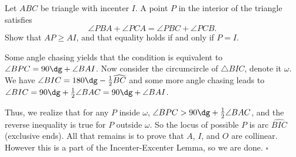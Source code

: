 
\begin{problem}[ISL 2006 G1]
    Let $ABC$ be triangle with incenter $I$. A point $P$ in the interior of the
    triangle satisfies \[\angle PBA+\angle PCA = \angle PBC+\angle PCB.\]
    Show that $AP \geq AI$, and that equality holds if and only if $P=I$.
\end{problem}

\begin{solution}[Ritwin]
    Some angle chasing yields that the condition is equivalent to
    $\angle BPC = 90\dg + \angle BAI$. Now consider the circumcircle of
    $\triangle BIC$, denote it $\omega$. We have $\angle BIC = 180\dg - \frac12\widehat{BC}$
    and some more angle chasing leads to $\angle BIC = 90\dg + \frac12 \angle BAC = 90\dg + \angle BAI$.
    
    Thus, we realize that for any $P$ inside $\omega$, $\angle BPC > 90\dg + \frac12 \angle BAC$,
    and the reverse inequality is true for $P$ outside $\omega$. So the locus
    of possible $P$ is arc $\widehat{BIC}$ (exclusive ends). All that remains
    is to prove that $A$, $I$, and $O$ are collinear. However this is a part of
    the Incenter-Excenter Lemma, so we are done. $\square$
\end{solution}

